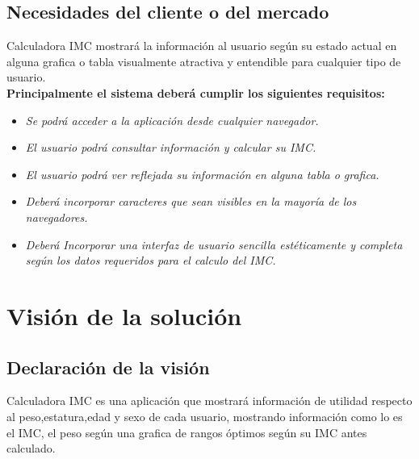 \documentclass[12pt,a4paper]{book}
\begin{document}
\section{Necesidades del cliente o del mercado}
\vspace{0.5 cm}
Calculadora IMC mostrará la información al usuario según su estado actual en alguna grafica o tabla visualmente atractiva y entendible para cualquier tipo de usuario.\\

\textbf{Principalmente el sistema deberá cumplir los siguientes requisitos: }
\vspace{0.5 cm}
\begin{itemize}
\item \textit{Se podrá acceder a la aplicación desde cualquier navegador.}
\item \textit{El usuario podrá consultar información y calcular su IMC.}
\item \textit{El usuario podrá ver reflejada su información en alguna tabla o grafica.}
\item \textit{Deberá incorporar caracteres que sean visibles en la mayoría de los navegadores.}
\item \textit{Deberá Incorporar una interfaz de usuario sencilla estéticamente y completa según los datos requeridos para el calculo del IMC.}
\end{itemize}
\chapter{Visión de la solución}

\section{Declaración de la visión}
\vspace{0.5 cm}
Calculadora IMC es una aplicación que mostrará información de utilidad respecto al peso,estatura,edad y sexo de cada usuario, mostrando información como lo es el IMC, el peso según una grafica de rangos óptimos según su IMC antes calculado. 
\end{document}
